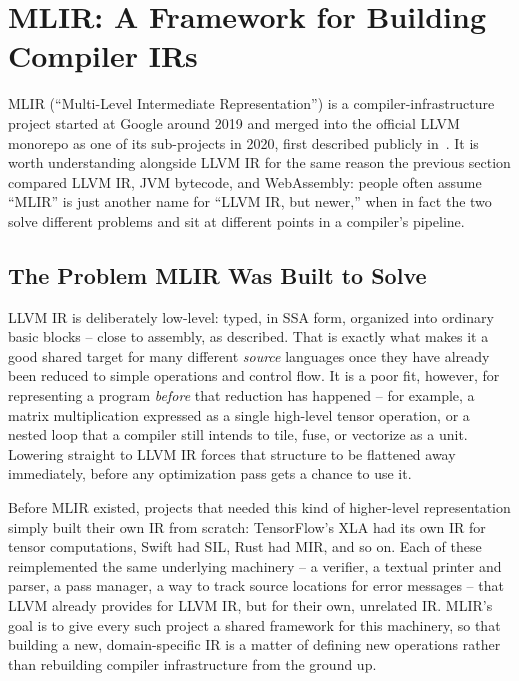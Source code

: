 \documentclass[full-course-notes.tex]{subfiles}
\begin{document}
\section{MLIR: A Framework for Building Compiler IRs}
\label{sec:l2-mlir}

MLIR (``Multi-Level Intermediate Representation'') is a compiler-infrastructure project started
at Google around 2019 and merged into the official LLVM monorepo as one of its sub-projects in
2020, first described publicly in~\cite{mlir}. It is worth understanding alongside LLVM IR for the same reason the
previous section compared LLVM IR, JVM bytecode, and WebAssembly: people often assume ``MLIR''
is just another name for ``LLVM IR, but newer,'' when in fact the two solve different problems
and sit at different points in a compiler's pipeline.

\subsection{The Problem MLIR Was Built to Solve}
\label{sec:l2-mlir-problem}

LLVM IR is deliberately low-level: typed, in SSA form, organized into ordinary basic blocks --
close to assembly, as  described. That is exactly what makes it a good shared target for many
different \emph{source} languages once they have already been reduced to simple operations and
control flow. It is a poor fit, however, for representing a program \emph{before} that
reduction has happened -- for example, a matrix multiplication expressed as a single high-level
tensor operation, or a nested loop that a compiler still intends to tile, fuse, or vectorize as a
unit. Lowering straight to LLVM IR forces that structure to be flattened away immediately, before
any optimization pass gets a chance to use it.

Before MLIR existed, projects that needed this kind of higher-level representation simply built
their own IR from scratch: TensorFlow's XLA had its own IR for tensor computations, Swift had
SIL, Rust had MIR, and so on. Each of these reimplemented the same underlying machinery --
a verifier, a textual printer and parser, a pass manager, a way to track source locations for
error messages -- that LLVM already provides for LLVM IR, but for their own, unrelated IR. MLIR's
goal is to give every such project a shared framework for this machinery, so that building a new,
domain-specific IR is a matter of defining new operations rather than rebuilding compiler
infrastructure from the ground up.
\end{document}
